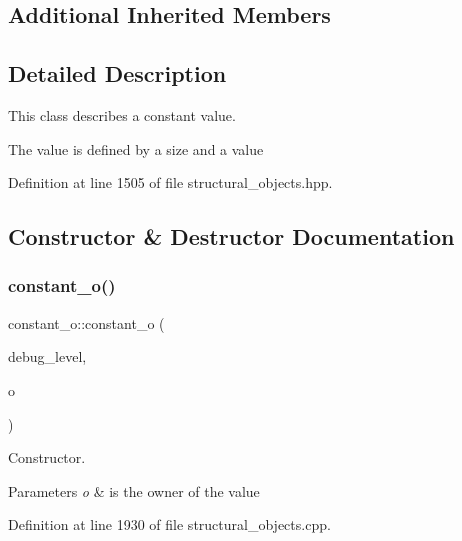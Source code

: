 \subsection*{Additional Inherited Members}


\subsection{Detailed Description}
This class describes a constant value. 

The value is defined by a size and a value 

Definition at line 1505 of file structural\+\_\+objects.\+hpp.



\subsection{Constructor \& Destructor Documentation}
\mbox{\label{classconstant__o_a839bd5cc769c8db27f57acd24855821e}} 
\subsubsection{\texorpdfstring{constant\+\_\+o()}{constant\_o()}\hspace{0.1cm}{\footnotesize\ttfamily [1/2]}}
{\footnotesize\ttfamily constant\+\_\+o\+::constant\+\_\+o (\begin{DoxyParamCaption}\item[{int}]{debug\+\_\+level,  }\item[{const \hyperlink{structural__objects_8hpp_a8ea5f8cc50ab8f4c31e2751074ff60b2}{structural\+\_\+object\+Ref}}]{o }\end{DoxyParamCaption})}



Constructor. 


\begin{DoxyParams}{Parameters}
{\em o} & is the owner of the value \\
\hline
\end{DoxyParams}


Definition at line 1930 of file structural\+\_\+objects.\+cpp.

\mbox{\label{classconstant__o_addb58fe18b2d23b9b721036414d59034}} 
